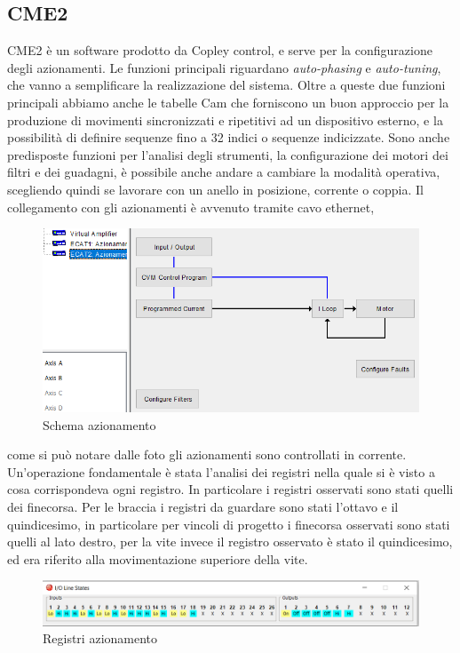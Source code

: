 \subsection{CME2}
CME2 è un software prodotto da Copley control, e serve per la configurazione degli azionamenti. Le funzioni principali riguardano \textit{auto-phasing} e \textit{auto-tuning}, che vanno a semplificare la realizzazione del sistema. Oltre a queste due funzioni principali abbiamo anche le tabelle Cam che forniscono un buon approccio per la produzione di movimenti sincronizzati e ripetitivi ad un dispositivo esterno, e la possibilità di definire sequenze fino a 32 indici o sequenze indicizzate. Sono anche predisposte funzioni per l'analisi degli strumenti, la configurazione dei motori dei filtri e dei guadagni, è possibile anche andare a cambiare la modalità operativa, scegliendo quindi se lavorare con un anello in posizione, corrente o coppia. Il collegamento con gli azionamenti è avvenuto tramite cavo ethernet, 
\begin{figure}[ht]
\begin{center}
    \includegraphics[scale=0.8]{Immagini/Sperimentale/azionamenti.PNG}
    \caption{Schema azionamento}
\end{center}
\end{figure}
come si può notare dalle foto gli azionamenti sono controllati in corrente. Un'operazione fondamentale è stata l'analisi dei registri nella quale si è visto a cosa corrispondeva ogni registro. In particolare i registri osservati sono stati quelli dei finecorsa.
Per le braccia i registri da guardare sono stati l'ottavo e il quindicesimo, in particolare per vincoli di progetto i finecorsa osservati sono stati quelli al lato destro, per la vite invece il registro osservato è stato il quindicesimo, ed era riferito alla movimentazione superiore della vite.
\begin{figure}[ht]
\begin{center}
    \includegraphics[scale=0.6]{Immagini/Sperimentale/registri.PNG}
    \caption{Registri azionamento}
\end{center}
\end{figure}
